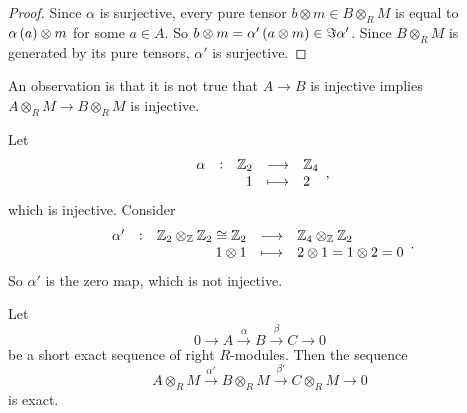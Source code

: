 \begin{proof}
Since $ \alpha $ is surjective, every pure tensor $ b \otimes m \in B \otimes_R M $ is equal to $ \alpha\br{a} \otimes m $ for some $ a \in A $. So $ b \otimes m = \alpha'\br{a \otimes m} \in \Im \alpha' $. Since $ B \otimes_R M $ is generated by its pure tensors, $ \alpha' $ is surjective.
\end{proof}

An observation is that it is not true that $ A \to B $ is injective implies $ A \otimes_R M \to B \otimes_R M $ is injective.

\begin{example*}
Let
$$ \function[\alpha]{\ZZ_2}{\ZZ_4}{1}{2}, $$
which is injective. Consider
$$ \function[\alpha']{\ZZ_2 \otimes_\ZZ \ZZ_2 \cong \ZZ_2}{\ZZ_4 \otimes_\ZZ \ZZ_2}{1 \otimes 1}{2 \otimes 1 = 1 \otimes 2 = 0}. $$
So $ \alpha' $ is the zero map, which is not injective.
\end{example*}

\begin{proposition}
Let
$$ 0 \to A \xrightarrow{\alpha} B \xrightarrow{\beta} C \to 0 $$
be a short exact sequence of right $ R $-modules. Then the sequence
$$ A \otimes_R M \xrightarrow{\alpha'} B \otimes_R M \xrightarrow{\beta'} C \otimes_R M \to 0 $$
is exact.
\end{proposition}

